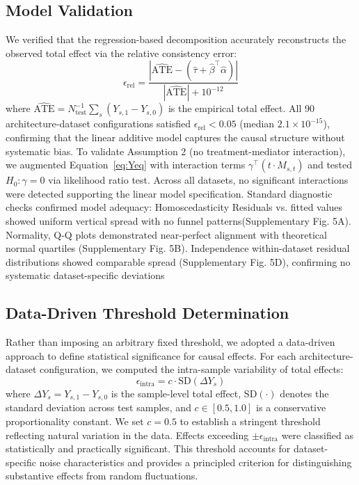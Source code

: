 \documentclass[
    reprint,
    amsmath, amssymb,
    aps,
    floatfix,
    nofootinbib
]{revtex4-1}
\begin{document}
\subsection*{Model Validation}

We verified that the regression-based decomposition accurately reconstructs the observed total effect via the relative consistency error:
\begin{equation}
\epsilon_{\text{rel}} = \frac{|\widehat{\text{ATE}} - (\hat{\tau} + \hat{\beta}^\top \hat{\alpha})|}{|\widehat{\text{ATE}}| + 10^{-12}}
\end{equation}
where $\widehat{\text{ATE}} = N_{\text{test}}^{-1} \sum_s (Y_{s,1} - Y_{s,0})$ is the empirical total effect. All 90 architecture-dataset configurations satisfied $\epsilon_{\text{rel}} < 0.05$ (median $2.1 \times 10^{-15}$), confirming that the linear additive model captures the causal structure without systematic bias.
To validate Assumption 2 (no treatment-mediator interaction), we augmented Equation~\ref{eq:Yeq} with interaction terms $\gamma^\top (t \cdot M_{s,t})$ and tested $H_0: \gamma = 0$ via likelihood ratio test. Across all datasets, no significant interactions were detected supporting the linear model specification.
Standard diagnostic checks confirmed model adequacy:
Homoscedasticity Residuals vs. fitted values showed uniform vertical spread with no funnel patterns(Supplementary Fig. 5A).  Normality, Q-Q plots demonstrated near-perfect alignment with theoretical normal quartiles (Supplementary Fig. 5B).
Independence within-dataset residual distributions showed comparable spread (Supplementary Fig. 5D), confirming no systematic dataset-specific deviations

\subsection*{Data-Driven Threshold Determination}

Rather than imposing an arbitrary fixed threshold, we adopted a data-driven approach to define statistical significance for causal effects. For each architecture-dataset configuration, we computed the intra-sample variability of total effects:
\begin{equation}
\epsilon_{\text{intra}} = c \cdot \text{SD}(\Delta Y_s)
\end{equation}
where $\Delta Y_s = Y_{s,1} - Y_{s,0}$ is the sample-level total effect, $\text{SD}(\cdot)$ denotes the standard deviation across test samples, and $c \in [0.5, 1.0]$ is a conservative proportionality constant. We set $c=0.5$ to establish a stringent threshold reflecting natural variation in the data. Effects exceeding $\pm \epsilon_{\text{intra}}$ were classified as statistically and practically significant. This threshold accounts for dataset-specific noise characteristics and provides a principled criterion for distinguishing substantive effects from random fluctuations.
\end{document}
